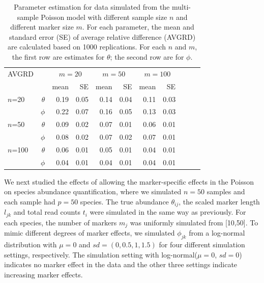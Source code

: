 \begin{table}[ht]
	\caption[Parameter estimation for data simulated from the multi-sample Poisson model]{Parameter estimation for data simulated from the multi-sample Poisson model with different sample size $n$ and different marker size $m$.  For each parameter, the mean and standard error (SE) of average relative difference (AVGRD) are calculated based on 1000 replications. For each $n$ and $m$, the first row are estimates for $\theta$; the second row are for $\phi$.   
		\label{MSSQTable1}}
	\begin{center}	\begin{tabular}{lrrrrrrrrrr}
			\hline
			AVGRD& & \multicolumn{2}{c}{$m = 20$} & \multicolumn{2}{c}{$m = 50$}  & \multicolumn{2}{c}{$m = 100$}    \\
			\cline{3-8}
			& & mean & SE & mean & SE & mean &  SE &  \\
			\hline
			$n$=20 & $\theta$ & 0.19 & 0.05 & 0.14 & 0.04 & 0.11 & 0.03  \\
			& $\phi$ & 0.22 & 0.07 & 0.16 & 0.05 & 0.13 & 0.03  \\
			$n$=50 & $\theta$ & 0.09 & 0.02 & 0.07 & 0.01 & 0.06 & 0.01  \\
			& $\phi$ & 0.08 & 0.02 & 0.07 & 0.02 & 0.07 & 0.01  \\
			$n$=100 & $\theta$ & 0.06 & 0.01 & 0.05 & 0.01 & 0.04 & 0.01  \\
			& $\phi$ & 0.04 & 0.01 & 0.04 & 0.01 & 0.04 & 0.01  \\
			
			\hline
		\end{tabular}
	\end{center}
\end{table}


We next  studied the effects of allowing the marker-specific effects in the Poisson on species abundance quantification, where we simulated $n=50$ samples and each sample had $p=50$ species.  The true abundance $\theta_{ij}$, the scaled marker length $l_{jk}$ and total read counts $t_i$ were simulated in the  same way  as previously. For each species, the number of markers $m_j$ was uniformly simulated from [10,50]. To mimic  different degrees of marker effects, we simulated $\phi_{jk}$ from a log-normal distribution with $\mu=0$ and $sd=(0, 0.5, 1, 1.5)$ for four different simulation settings, respectively. The simulation setting with log-normal($\mu=0$, $sd=0$) indicates no marker effect in the data and the other three settings indicate increasing marker effects.


